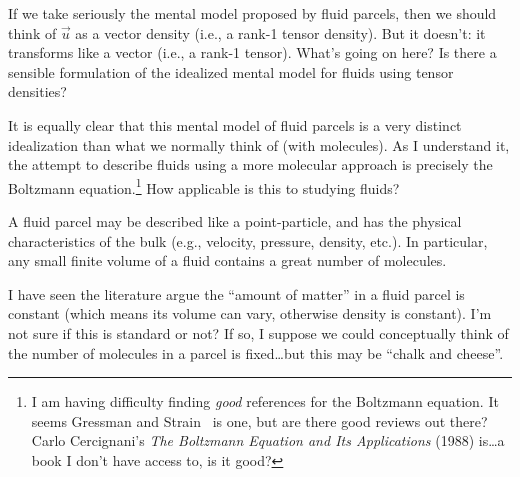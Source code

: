 \begin{node}
\begin{node}
\begin{puzzle}
If we take seriously the mental model proposed by fluid parcels, then we
should think of $\vec{u}$ as a vector density (i.e., a rank-1 tensor density). 
But it doesn't: it transforms like a vector (i.e., a rank-1 tensor).
What's going on here? Is there a sensible formulation of the idealized
mental model for fluids using tensor densities? 
\end{puzzle}

\begin{puzzle}
It is equally clear that this mental model of fluid parcels is a very
distinct idealization than what we normally think of (with molecules).
As I understand it, the attempt to describe fluids using a more
molecular approach is precisely the Boltzmann equation.\footnote{I am
having difficulty finding \emph{good} references for the Boltzmann
equation. It seems Gressman and Strain~\cite{gressman2011global} is one,
but are there good reviews out there? Carlo Cercignani's
\textit{The Boltzmann Equation and Its Applications} (1988) is\dots a
book I don't have access to, is it good?} How applicable
is this to studying fluids?
\end{puzzle}
\end{node} %

\begin{node}\label{fluids:describing-000A}%
A fluid parcel may be described like a point-particle, and has the
physical characteristics of the bulk (e.g., velocity, pressure, density,
etc.). In particular, any small finite volume of a fluid contains a
great number of molecules.

\begin{node}[Remark]\label{fluids:describing-000B}%
I have seen the literature argue the ``amount of matter'' in a fluid
parcel is constant (which means its volume can vary, otherwise density
is constant). I'm not sure if this is standard or not? If so, I suppose
we could conceptually think of the number of molecules in a parcel is
fixed\dots but this may be ``chalk and cheese''.
\end{node} %


\end{node}
\end{node}
